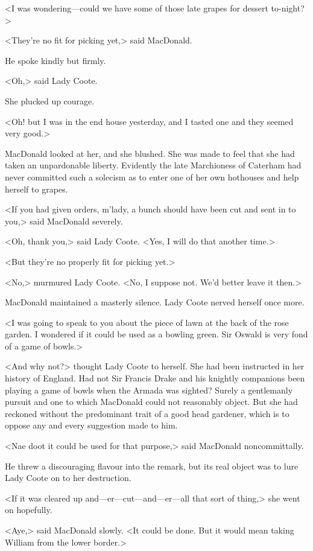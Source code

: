 <I was wondering—could we have some of those late grapes for dessert to-night?>

<They're no fit for picking yet,> said MacDonald.

He spoke kindly but firmly.

<Oh,> said Lady Coote.

She plucked up courage.

<Oh! but I was in the end house yesterday, and I tasted one and they seemed very good.>

MacDonald looked at her, and she blushed. She was made to feel that she had taken an unpardonable liberty. Evidently the late Marchioness of Caterham had never committed such a solecism as to enter one of her own hothouses and help herself to grapes.

<If you had given orders, m'lady, a bunch should have been cut and sent in to you,> said MacDonald severely.

<Oh, thank you,> said Lady Coote. <Yes, I will do that another time.>

<But they're no properly fit for picking yet.>

<No,> murmured Lady Coote. <No, I suppose not. We'd better leave it then.>

MacDonald maintained a masterly silence. Lady Coote nerved herself once more.

<I was going to speak to you about the piece of lawn at the back of the rose garden. I wondered if it could be used as a bowling green. Sir Oswald is very fond of a game of bowls.>

<And why not?> thought Lady Coote to herself. She had been instructed in her history of England. Had not Sir Francis Drake and his knightly companions been playing a game of bowls when the Armada was sighted? Surely a gentlemanly pursuit and one to which MacDonald could not reasonably object. But she had reckoned without the predominant trait of a good head gardener, which is to oppose any and every suggestion made to him.

<Nae doot it could be used for that purpose,> said MacDonald noncommittally.

He threw a discouraging flavour into the remark, but its real object was to lure Lady Coote on to her destruction.

<If it was cleared up and—er—cut—and—er—all that sort of thing,> she went on hopefully.

<Aye,> said MacDonald slowly. <It could be done. But it would mean taking William from the lower border.>

